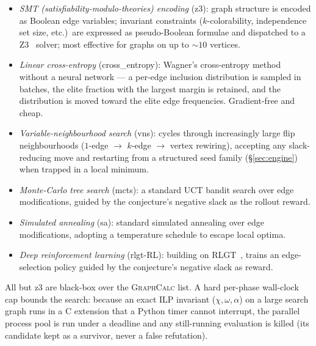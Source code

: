 \documentclass[]{ceurart}
\begin{document}
\begin{itemize}
  \item \emph{SMT (satisfiability-modulo-theories) encoding} (\textsf{z3}): graph structure is encoded as Boolean edge
    variables; invariant constraints ($k$-colorability, independence set size,
    etc.)\ are expressed as pseudo-Boolean formulae and dispatched to a
    Z3~\cite{demoura2008z3} solver; most effective for graphs on up to $\sim\!10$ vertices.
  \item \emph{Linear cross-entropy} (\textsf{cross\_entropy}): Wagner's
    cross-entropy method~\cite{wagner2021constructions} without a neural network
    --- a per-edge inclusion distribution is sampled in batches, the elite
    fraction with the largest margin is retained, and the distribution is moved
    toward the elite edge frequencies. Gradient-free and cheap.
  \item \emph{Variable-neighbourhood search} (\textsf{vns}): cycles through
    increasingly large flip neighbourhoods ($1$-edge $\to$ $k$-edge $\to$ vertex
    rewiring), accepting any slack-reducing move and restarting from a structured
    seed family (\S\ref{sec:engine}) when trapped in a local minimum.
  \item \emph{Monte-Carlo tree search} (\textsf{mcts}): a standard UCT bandit search
    over edge modifications, guided by the conjecture's negative slack as the rollout reward.
  \item \emph{Simulated annealing} (\textsf{sa}): standard simulated annealing over edge modifications, adopting a temperature schedule to escape local optima.
  \item \emph{Deep reinforcement learning} (\textsf{rlgt-RL}): building on RLGT~\cite{wagner2021constructions}, trains an edge-selection policy guided by the conjecture's negative slack as reward.
\end{itemize}

All but \textsf{z3} are black-box over the \textsc{GraphCalc} list. A hard
per-phase wall-clock cap bounds the search: because an exact ILP invariant
($\chi,\omega,\alpha$) on a large search graph runs in a C extension that a
Python timer cannot interrupt, the parallel process pool is run under a deadline and any
still-running evaluation is killed (its candidate kept as a survivor, never a
false refutation).
\end{document}
